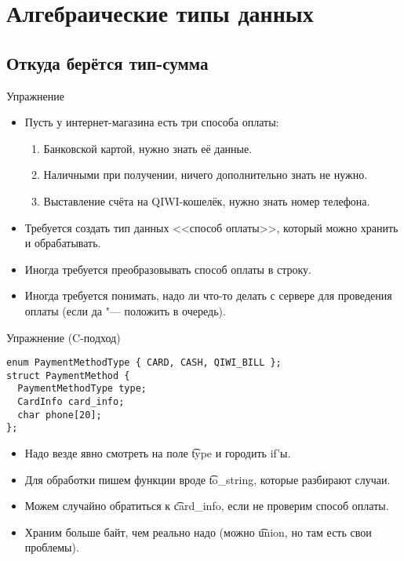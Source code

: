 \section{Алгебраические типы данных}
\subsection{Откуда берётся тип-сумма}

\begin{frame}
\end{frame}

\begin{frame}{Упражнение}
	\begin{itemize}
		\item Пусть у интернет-магазина есть три способа оплаты:
			\begin{enumerate}
				\item Банковской картой, нужно знать её данные.
				\item Наличными при получении, ничего дополнительно знать не нужно.
				\item Выставление счёта на QIWI-кошелёк, нужно знать номер телефона.
			\end{enumerate}
		\item Требуется создать тип данных <<способ оплаты>>, который можно хранить и обрабатывать.
		\item Иногда требуется преобразовывать способ оплаты в строку.
		\item Иногда требуется понимать, надо ли что-то делать с сервере для проведения оплаты (если да "--- положить в очередь).
	\end{itemize}
\end{frame}

\begin{frame}[fragile]{Упражнение (C-подход)}
\begin{verbatim}
enum PaymentMethodType { CARD, CASH, QIWI_BILL };
struct PaymentMethod {
  PaymentMethodType type;
  CardInfo card_info;
  char phone[20];
};
\end{verbatim}
	\begin{itemize}
		\item Надо везде явно смотреть на поле \t{type} и городить if'ы.
		\item Для обработки пишем функции вроде \t{to\_string}, которые разбирают случаи.
		\item Можем случайно обратиться к \t{card\_info}, если не проверим способ оплаты.
		\item Храним больше байт, чем реально надо (можно \t{union}, но там есть свои проблемы).
	\end{itemize}
\end{frame}

